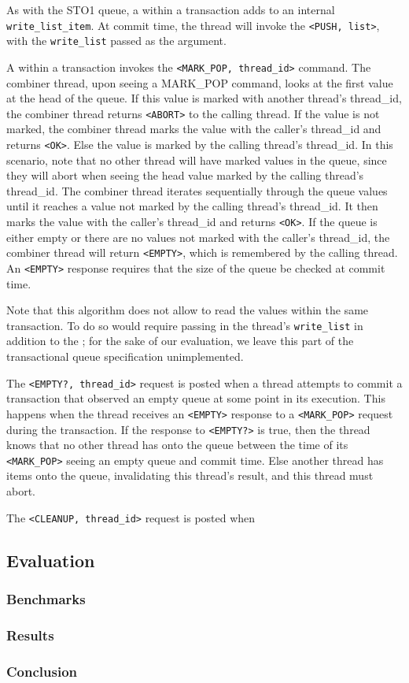 As with the STO1 queue, a \push within a transaction adds to an internal \texttt{write\_list\_item}. At commit time, the thread will invoke the \texttt{<PUSH, list>}, with the \texttt{write\_list} passed as the argument.

A \pop within a transaction invokes the \texttt{<MARK\_POP, thread\_id>} command. The combiner thread, upon seeing a MARK\_POP command, looks at the first value at the head of the queue. If this value is marked with another thread’s thread\_id, the combiner thread returns \texttt{<ABORT>} to the calling thread. If the value is not marked, the combiner thread marks the value with the caller’s thread\_id and returns \texttt{<OK>}. Else the value is marked by the calling thread’s thread\_id. In this scenario, note that no other thread will have marked values in the queue, since they will abort when seeing the head value marked by the calling thread’s thread\_id. The combiner thread iterates sequentially through the queue values until it reaches a value not marked by the calling thread’s thread\_id. It then marks the value with the caller’s thread\_id and returns \texttt{<OK>}. If the queue is either empty or there are no values not marked with the caller’s thread\_id, the combiner thread will return \texttt{<EMPTY>}, which is remembered by the calling thread. An \texttt{<EMPTY>} response requires that the size of the queue be checked at commit time.

Note that this algorithm does not allow \pops to read the values \pushed within the same transaction. To do so would require passing in the thread’s \texttt{write\_list} in addition to the ; for the sake of our evaluation, we leave this part of the transactional queue specification unimplemented.

The \texttt{<EMPTY?, thread\_id>} request is posted when a thread attempts to commit a transaction that observed an empty queue at some point in its execution. This happens when the thread receives an \texttt{<EMPTY>} response to a \texttt{<MARK\_POP>} request during the transaction. If the response to \texttt{<EMPTY?>} is true, then the thread knows that no other thread has \pushed onto the queue between the time of its \texttt{<MARK\_POP>} seeing an empty queue and commit time. Else another thread has \pushed items onto the queue, invalidating this thread’s \pop result, and this thread must abort.

The \texttt{<CLEANUP, thread\_id>} request is posted when 

\subsection{Evaluation}
\subsubsection{Benchmarks}
\subsubsection{Results}
\subsubsection{Conclusion}

